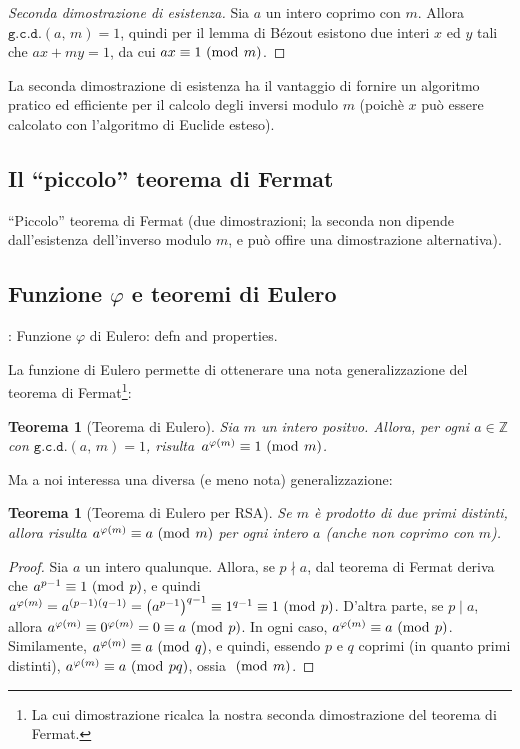 \documentclass[pdflatex,11pt,a4paper,oneside]{article}
\renewcommand{\phi}{\varphi}
\newcommand{\XXX}[1][XXX]{\text{\bfseries{\color{red}{\emph{#1}}}}}
\newcommand{\TODO}[0]{\XXX[TODO]}
\newcommand{\p}[1]{\left({#1}\right)}
\newcommand{\Z}[0]{\mathbb{Z}}
\newcommand{\divides}[0]{\mid}
\newcommand{\notdivides}[0]{\nmid}
\newcommand{\congruent}[0]{\equiv}
\newcommand{\mmodop}[0]{\ensuremath{\operatorname{mod}}}
\newcommand{\mmod}[1]{\ensuremath{\allowbreak\ (\mmodop\:{#1})}}
\newcommand{\gcdop}[0]{\ensuremath{\mathtt{g.c.d.}}}
\newcommand{\xgcd}[1]{\ensuremath{\gcdop\left({#1}\right)}}
\renewcommand{\gcd}[2]{\xgcd{{#1},\,{#2}}}
\newtheorem{theorem}[TheoremLike]{Teorema}
\begin{document}
\begin{proof}[Seconda dimostrazione di esistenza]
Sia $a$ un intero coprimo con $m$.  Allora $\gcd{a}{m} = 1$, quindi per il
lemma di B\'ezout esistono due interi $x$ ed $y$ tali che $ax + my = 1$,
da cui $ax \congruent 1 \mmod m$.
\end{proof}

La seconda dimostrazione di esistenza ha il vantaggio di fornire un
algoritmo pratico ed efficiente per il calcolo degli inversi modulo $m$
(poich\`e $x$ pu\`o essere calcolato con l'algoritmo di Euclide esteso).


\subsection{Il ``piccolo'' teorema di Fermat}

``Piccolo'' teorema di Fermat (due dimostrazioni; la seconda non dipende
dall'esistenza dell'inverso modulo $m$, e pu\`o offire una dimostrazione
alternativa).


\subsection{Funzione $\phi$ e teoremi di Eulero}

\TODO: Funzione $\phi$ di Eulero: defn and properties.

La funzione di Eulero permette di ottenerare una nota generalizzazione
del teorema di Fermat\footnote{La cui dimostrazione ricalca la nostra
seconda dimostrazione del teorema di Fermat.}:

\begin{theorem}[Teorema di Eulero]\label{thm:euler}
  Sia $m$ un intero positvo. Allora, per ogni $a \in \Z$ con
  $\gcd{a}{m} = 1$, risulta\, $a^{\phi(m)} \congruent 1 \mmod m$.
\end{theorem}

\noindent
Ma a noi interessa una diversa (e meno nota) generalizzazione:

\begin{theorem}[Teorema di Eulero per RSA]\label{thm:euler-rsa}
Se $m$ \`e prodotto di due primi \emph{distinti}, allora risulta
$a^{\phi(m)} \congruent a \mmod m$ per \emph{ogni} intero $a$ (anche
non coprimo con $m$).
\end{theorem}
%
\begin{proof}
Sia $a$ un intero qualunque.  Allora, se $p \notdivides a$, dal teorema
di Fermat deriva che $a^{p-1} \congruent 1 \mmod p$, e quindi
$a^{\phi(m)} = a^{(p-1)(q-1)} = {\p{a^{p-1}}}^{q-1} \congruent 1^{q-1}
\congruent 1 \mmod p$.  D'altra parte, se $p \divides a$, allora
$a^{\phi(m)} \congruent 0^{\phi(m)} = 0 \congruent a \mmod p$.  In ogni
caso, $a^{\phi(m)} \congruent a \mmod p$.  Similamente, $a^{\phi(m)}
\congruent a \mmod q$, e quindi, essendo $p$ e $q$ coprimi (in quanto
primi distinti), $a^{\phi(m)} \congruent a \mmod{pq}$, ossia $\mmod m$.
\end{proof}
\end{document}
